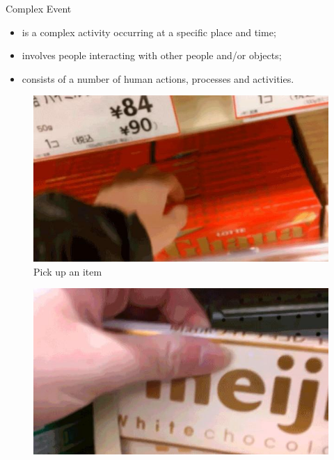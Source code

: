 \documentclass{beamer}
\begin{document}
\begin{frame}[t]{Complex Event}
	\begin{definition} 
		\begin{itemize}
		\item is a complex activity occurring at a specific place and time;
		\item involves people interacting with other people and/or objects;
		\item consists of a number of human actions, processes and activities.
		\end{itemize}
	\end{definition}
	\begin{center}
	\begin{figure}
		\centering
		\begin{minipage}{.3\textwidth}
			\centering
			\includegraphics[width=1\linewidth]{images/part1/shoplifting1.jpg}
			\\
			\tiny{Pick up an item}
		\end{minipage}%
		\begin{minipage}{.3\textwidth}
			\centering
			\includegraphics[width=1\linewidth]{images/part1/shoplifting2.jpg}

\end{minipage}
\end{figure}
\end{center}
\end{frame}
\end{document}
